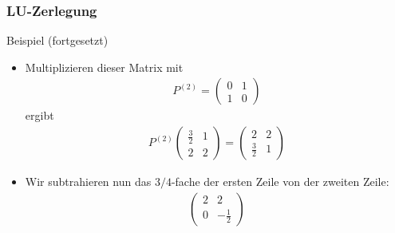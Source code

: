 \documentclass{beamer}
\newcommand{\mytitle}{LU-Zerlegung}
\begin{document}
\begin{frame}\frametitle{\mytitle}
	\begin{block}{Beispiel (fortgesetzt)}
		\begin{itemize}
			\item Multiplizieren dieser Matrix mit
				\begin{align*}
					P^{(2)}=\begin{pmatrix} 0&1\\1&0 \end{pmatrix}
				\end{align*}
				ergibt
				\begin{align*}
					P^{(2)}\begin{pmatrix} \frac{3}{2}&1\\2&2 \end{pmatrix}=\begin{pmatrix} 2&2\\\frac{3}{2}&1 \end{pmatrix}
				\end{align*}
			\item Wir subtrahieren nun das $3/4$-fache der ersten Zeile von der zweiten Zeile:
				\begin{align*}
					\begin{pmatrix}2&2\\0&-\frac{1}{2}\end{pmatrix}
				\end{align*}
		\end{itemize}
	\end{block}
\end{frame}
\end{document}
